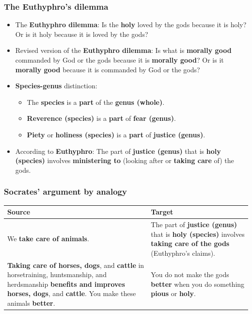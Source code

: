 \documentclass[11pt]{article}
\begin{document}
\subsubsection{The Euthyphro's dilemma}
\label{sec:orgeb97d0d}
\begin{itemize}
\item The \textbf{Euthyphro dilemma}:
Is the \textbf{holy} loved by the gods because it is holy? Or is it holy because it is loved by the gods?
\item Revised version of the \textbf{Euthyphro dilemma}:
Is what is \textbf{morally good} commanded by God or the gods because it is \textbf{morally good}? Or is it \textbf{morally good} because it is commanded by God or the gods?
\item \textbf{Species-genus} distinction:
\begin{itemize}
\item The \textbf{species} is a \textbf{part} of the \textbf{genus (whole)}.
\item \textbf{Reverence (species)} is a \textbf{part} of \textbf{fear (genus)}.
\item \textbf{Piety} or \textbf{holiness (species)} is a \textbf{part} of \textbf{justice (genus)}.
\end{itemize}
\item According to \textbf{Euthyphro}:
The part of \textbf{justice (genus)} that is \textbf{holy (species)} involves \textbf{ministering to} (looking after or \textbf{taking care} of) the gods.
\end{itemize}
\subsubsection{Socrates' argument by analogy}
\label{sec:orgbc63fa2}
\begin{center}
\begin{tabularx}{\textwidth}{|X|X|}
\hline
Source & Target\\
\hline
We \textbf{take care of animals}. & The part of \textbf{justice (genus)} that is \textbf{holy (species)} involves \textbf{taking care of the gods} (Euthyphro's claims).\\
\hline
\textbf{Taking care of horses, dogs}, and \textbf{cattle} in horsetraining, huntsmanship, and herdsmanship \textbf{benefits and improves horses, dogs}, and \textbf{cattle}. You make these animals \textbf{better}. & You do not make the gods \textbf{better} when you do something \textbf{pious} or \textbf{holy}.\\
\hline
\end{tabularx}
\end{center}
\end{document}
